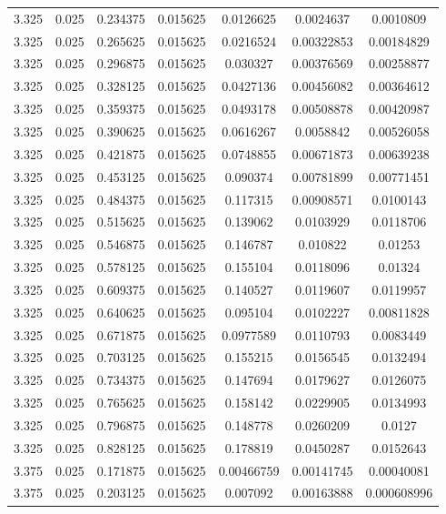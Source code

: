 \begin{table}[bh]
\begin{center}
{\begin{tabular}{ccccccc}
3.325	 & 0.025 & 	0.234375	 & 0.015625	 & 0.0126625	 & 0.0024637	 & 0.0010809 \\ 
3.325	 & 0.025 & 	0.265625	 & 0.015625	 & 0.0216524	 & 0.00322853	 & 0.00184829 \\ 
3.325	 & 0.025 & 	0.296875	 & 0.015625	 & 0.030327	 & 0.00376569	 & 0.00258877 \\ 
3.325	 & 0.025 & 	0.328125	 & 0.015625	 & 0.0427136	 & 0.00456082	 & 0.00364612 \\ 
3.325	 & 0.025 & 	0.359375	 & 0.015625	 & 0.0493178	 & 0.00508878	 & 0.00420987 \\ 
3.325	 & 0.025 & 	0.390625	 & 0.015625	 & 0.0616267	 & 0.0058842	 & 0.00526058 \\ 
3.325	 & 0.025 & 	0.421875	 & 0.015625	 & 0.0748855	 & 0.00671873	 & 0.00639238 \\ 
3.325	 & 0.025 & 	0.453125	 & 0.015625	 & 0.090374	 & 0.00781899	 & 0.00771451 \\ 
3.325	 & 0.025 & 	0.484375	 & 0.015625	 & 0.117315	 & 0.00908571	 & 0.0100143 \\ 
3.325	 & 0.025 & 	0.515625	 & 0.015625	 & 0.139062	 & 0.0103929	 & 0.0118706 \\ 
3.325	 & 0.025 & 	0.546875	 & 0.015625	 & 0.146787	 & 0.010822	 & 0.01253 \\ 
3.325	 & 0.025 & 	0.578125	 & 0.015625	 & 0.155104	 & 0.0118096	 & 0.01324 \\ 
3.325	 & 0.025 & 	0.609375	 & 0.015625	 & 0.140527	 & 0.0119607	 & 0.0119957 \\ 
3.325	 & 0.025 & 	0.640625	 & 0.015625	 & 0.095104	 & 0.0102227	 & 0.00811828 \\ 
3.325	 & 0.025 & 	0.671875	 & 0.015625	 & 0.0977589	 & 0.0110793	 & 0.0083449 \\ 
3.325	 & 0.025 & 	0.703125	 & 0.015625	 & 0.155215	 & 0.0156545	 & 0.0132494 \\ 
3.325	 & 0.025 & 	0.734375	 & 0.015625	 & 0.147694	 & 0.0179627	 & 0.0126075 \\ 
3.325	 & 0.025 & 	0.765625	 & 0.015625	 & 0.158142	 & 0.0229905	 & 0.0134993 \\ 
3.325	 & 0.025 & 	0.796875	 & 0.015625	 & 0.148778	 & 0.0260209	 & 0.0127 \\ 
3.325	 & 0.025 & 	0.828125	 & 0.015625	 & 0.178819	 & 0.0450287	 & 0.0152643 \\ 
3.375	 & 0.025 & 	0.171875	 & 0.015625	 & 0.00466759	 & 0.00141745	 & 0.00040081 \\ 
3.375	 & 0.025 & 	0.203125	 & 0.015625	 & 0.007092	 & 0.00163888	 & 0.000608996 \\ 

\end{tabular}}
\end{center}
\end{table}
